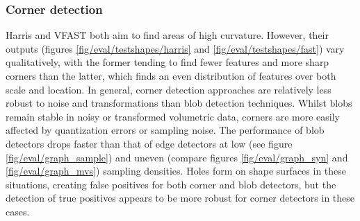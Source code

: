 \subsubsection{Corner detection} Harris and VFAST both aim to find areas of high curvature. However, their outputs (figures \ref{fig/eval/testshapes/harris} and \ref{fig/eval/testshapes/fast}) vary qualitatively, with the former tending to find fewer features and more sharp corners than the latter, which finds an even distribution of features over both scale and location. In general, corner detection approaches are relatively less robust to noise and transformations than blob detection techniques. Whilst blobs remain stable in noisy or transformed volumetric data, corners are more easily affected by quantization errors or sampling noise. 
The performance of blob detectors drops faster than that of edge detectors at low (see figure \ref{fig/eval/graph_sample}) and uneven (compare figures \ref{fig/eval/graph_syn} and \ref{fig/eval/graph_mvs}) sampling densities. Holes form on shape surfaces in these situations, creating false positives for both corner and blob detectors, but the detection of true positives appears to be more robust for corner detectors in these cases. 

